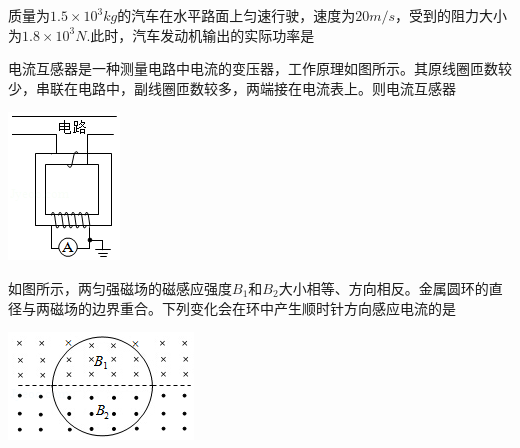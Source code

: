 \question[6] 质量为$1.5\times 10^3kg$的汽车在水平路面上匀速行驶，速度为$20m/s$，受到的阻力大小为$1.8\times 10^3N.$此时，汽车发动机输出的实际功率是
\begin{solution}{4cm}

\end{solution}



\question[6] 电流互感器是一种测量电路中电流的变压器，工作原理如图所示。其原线圈匝数较少，串联在电路中，副线圈匝数较多，两端接在电流表上。则电流互感器\begin{center}\includegraphics[]{img/image1.png}\end{center}
\begin{solution}{4cm}

\end{solution}



\question[6] 如图所示，两匀强磁场的磁感应强度$B_1$和$B_2$大小相等、方向相反。金属圆环的直径与两磁场的边界重合。下列变化会在环中产生顺时针方向感应电流的是\begin{center}\includegraphics[]{img/image2.png}\end{center}
\begin{solution}{4cm}

\end{solution}


